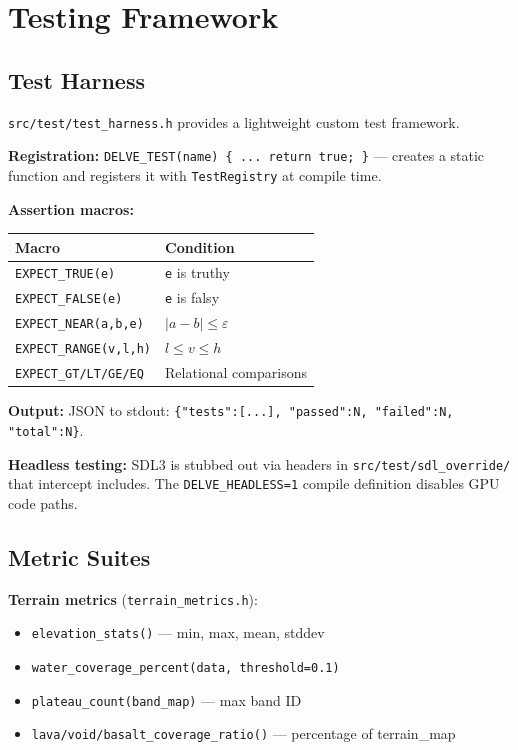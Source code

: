 \documentclass[11pt,a4paper]{article}
\begin{document}
\section{Testing Framework}
\label{sec:testing}

\subsection{Test Harness}

\texttt{src/test/test\_harness.h} provides a lightweight custom test framework.

\textbf{Registration:} \texttt{DELVE\_TEST(name) \{ ... return true; \}} --- creates a static function and registers it with \texttt{TestRegistry} at compile time.

\textbf{Assertion macros:}
\begin{table}[h]
\centering
\begin{tabular}{@{}lp{7cm}@{}}
\toprule
\textbf{Macro} & \textbf{Condition} \\
\midrule
\texttt{EXPECT\_TRUE(e)}      & \texttt{e} is truthy \\
\texttt{EXPECT\_FALSE(e)}     & \texttt{e} is falsy \\
\texttt{EXPECT\_NEAR(a,b,e)}  & $|a-b| \leq \varepsilon$ \\
\texttt{EXPECT\_RANGE(v,l,h)} & $l \leq v \leq h$ \\
\texttt{EXPECT\_GT/LT/GE/EQ}  & Relational comparisons \\
\bottomrule
\end{tabular}
\end{table}

\textbf{Output:} JSON to stdout: \texttt{\{"tests":[...], "passed":N, "failed":N, "total":N\}}.

\textbf{Headless testing:} SDL3 is stubbed out via headers in \texttt{src/test/sdl\_override/} that intercept includes. The \texttt{DELVE\_HEADLESS=1} compile definition disables GPU code paths.

\subsection{Metric Suites}

\textbf{Terrain metrics} (\texttt{terrain\_metrics.h}):
\begin{itemize}
  \item \texttt{elevation\_stats()} --- min, max, mean, stddev
  \item \texttt{water\_coverage\_percent(data, threshold=0.1)}
  \item \texttt{plateau\_count(band\_map)} --- max band ID
  \item \texttt{lava/void/basalt\_coverage\_ratio()} --- percentage of terrain\_map
\end{itemize}
\end{document}
